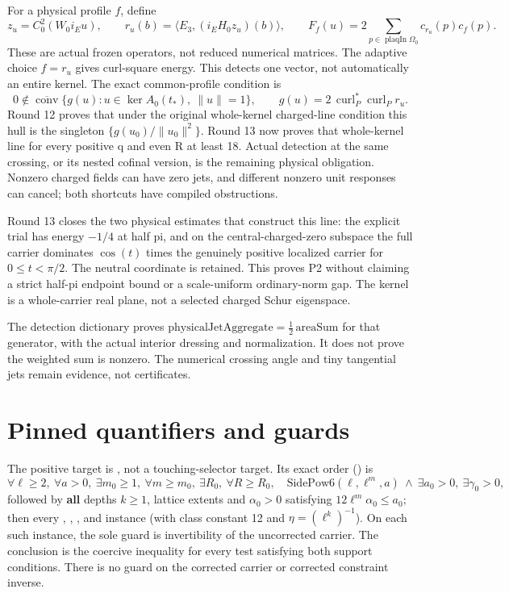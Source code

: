 For a physical profile \(f\), define
\[
 z_u=C^2_0(W_0i_Eu),\qquad r_u(b)=\langle E_3,(i_EH_0z_u)(b)\rangle,
 \qquad F_f(u)=2\sum_{p\in\operatorname{plaqIn}\Omega_0}c_{r_u}(p)c_f(p).
\]
These are actual frozen operators, not reduced numerical matrices. The adaptive choice \(f=r_u\) gives curl-square energy. This detects one vector, not automatically an entire kernel. The exact common-profile condition is
\[
0\notin\overline{\operatorname{conv}}\{g(u):u\in\ker A_0(t_*),\ \|u\|=1\},
\qquad g(u)=2\,\operatorname{curl}_P^*\operatorname{curl}_P r_u.
\]
Round 12 proves that under the original whole-kernel charged-line condition this hull is the singleton \(\{g(u_0)/\|u_0\|^2\}\). Round 13 now proves that whole-kernel line for every positive q and even R at least 18. Actual detection at the same crossing, or its nested cofinal version, is the remaining physical obligation. Nonzero charged fields can have zero jets, and different nonzero unit responses can cancel; both shortcuts have compiled obstructions.

Round 13 closes the two physical estimates that construct this line: the explicit trial has energy \(-1/4\) at half pi, and on the central-charged-zero subspace the full carrier dominates \(\cos(t)\) times the genuinely positive localized carrier for \(0\le t<\pi/2\). The neutral coordinate is retained. This proves P2 without claiming a strict half-pi endpoint bound or a scale-uniform ordinary-norm gap. The kernel is a whole-carrier real plane, not a selected charged Schur eigenspace.

The detection dictionary proves \(\mathrm{physicalJetAggregate}=\tfrac12\,\mathrm{areaSum}\) for that generator, with the actual interior dressing and normalization. It does not prove the weighted sum is nonzero. The numerical crossing angle and tiny tangential jets remain evidence, not certificates.

\section{Pinned quantifiers and guards}

The positive target is \texttt{}, not a touching-selector target. Its exact order (\texttt{}) is
\[
\forall \ell\ge2,\ \forall a>0,\ \exists m_0\ge1,\ \forall m\ge m_0,\ \exists R_0,\ \forall R\ge R_0,
\quad \mathrm{SidePow6}(\ell,\ell^m,a)\ \land\ \exists a_0>0,\ \exists\gamma_0>0,
\]
followed by \textbf{all} depths \(k\ge1\), lattice extents and \(\alpha_0>0\) satisfying \(12\ell^m\alpha_0\le a_0\); then every \texttt{}, \texttt{}, \texttt{}, and \texttt{} instance (with class constant 12 and \(\eta=(\ell^k)^{-1}\)). On each such instance, the sole guard is invertibility of the uncorrected carrier. The conclusion is the coercive inequality for every test satisfying both support conditions. There is no guard on the corrected carrier or corrected constraint inverse.

